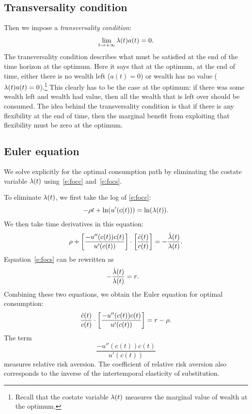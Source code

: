 \documentclass[letterpaper, 11pt, leqno]{article}
\begin{document}
\subsection{Transversality condition} 

Then we impose a \textit{transversality condition}:
\begin{equation}
\lim_{t\to+\infty} \lambda(t) a(t)=0.\label{e:trans1}
\end{equation}
The transversality condition describes what must be satisfied at the end of the time horizon at the optimum. Here it says that at the optimum, at the end of time, either there is no wealth left ($a(t)=0$) or wealth has no value ($\lambda(t) a(t)=0$).\footnote{Recall that the costate variable $\lambda(t)$ measures the marginal value of wealth at the optimum.} This clearly has to be the case at the optimum: if there was some wealth left and wealth had value, then all the wealth that is left over should be consumed. The idea behind the transversality condition is that if there is any flexibility at the end of time, then the marginal benefit from exploiting that flexibility must be zero at the optimum.

\subsection{Euler equation} 

We solve explicitly for the optimal consumption path by eliminating the costate variable $\lambda(t)$ using~\eqref{e:focc} and~\eqref{e:focs}. 

To eliminate $\lambda(t)$, we first take the log of \eqref{e:focc}:
\begin{equation*}
-\r t+ \ln{u'(c(t))} =\ln{\l(t)}.
\end{equation*}
We then take time derivatives in this equation:
\begin{equation*}
\rho+\left[ \frac{-u''(c(t)) c(t)}{u'(c(t))} \right]\cdot \left[ \frac{\dot{c}(t)}{c(t)} \right] =-\frac{\dot{\lambda}(t)}{\lambda(t)}.
\end{equation*}
Equation~\eqref{e:focs} can be rewritten as
\begin{align*}
-\frac{\dot{\lambda}(t)}{\lambda(t)}&= r.
\end{align*}
Combining these two equations, we obtain the Euler equation for optimal consumption:
\begin{equation}
\frac{\dot{c}(t)}{c(t)}\cdot \left[ \frac{-u''(c(t)) c(t)}{u'(c(t))} \right] =r-\rho.
\label{e:EULER}\end{equation}
The term 
\begin{equation*}
\frac{-u''(c(t))c(t)}{u'(c(t))}
\end{equation*} 
measures relative risk aversion. The coefficient of relative risk aversion also corresponds to the inverse of the intertemporal elasticity of substitution.
\end{document}
